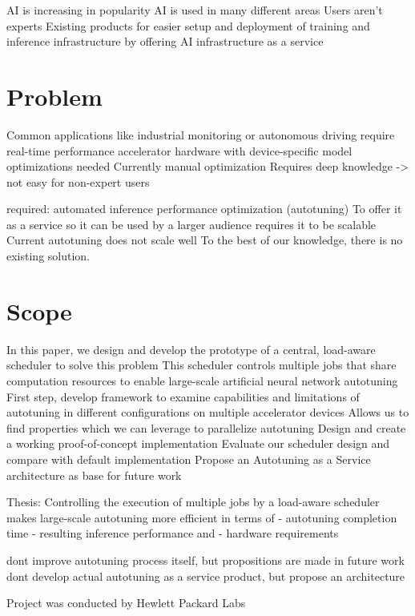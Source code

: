 AI is increasing in popularity
AI is used in many different areas
Users aren't experts
Existing products for easier setup and deployment of training and inference infrastructure by offering AI infrastructure as a service

\section{Problem}
Common applications like industrial monitoring or autonomous driving require real-time performance
accelerator hardware with device-specific model optimizations needed
Currently manual optimization
Requires deep knowledge -> not easy for non-expert users

required: automated inference performance optimization (autotuning)
To offer it as a service so it can be used by a larger audience requires it to be scalable
Current autotuning does not scale well
To the best of our knowledge, there is no existing solution.

\section{Scope}
In this paper, we design and develop the prototype of a central, load-aware scheduler to solve this problem
This scheduler controls multiple jobs that share computation resources to enable large-scale artificial neural network autotuning
First step, develop framework to examine capabilities and limitations of autotuning in different configurations on multiple accelerator devices
Allows us to find properties which we can leverage to parallelize autotuning
Design and create a working proof-of-concept implementation
Evaluate our scheduler design and compare with default implementation
Propose an Autotuning as a Service architecture as base for future work

Thesis:
Controlling the execution of multiple jobs by a load-aware scheduler makes large-scale autotuning more efficient in terms of
- autotuning completion time
- resulting inference performance and 
- hardware requirements

dont improve autotuning process itself, but propositions are made in future work
dont develop actual autotuning as a service product, but propose an architecture

Project was conducted by Hewlett Packard Labs
